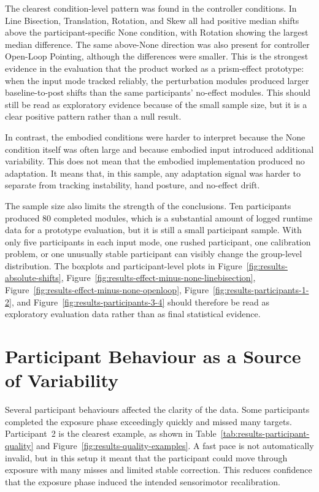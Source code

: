 The clearest condition-level pattern was found in the controller conditions. In Line Bisection, Translation, Rotation, and Skew all had positive median shifts above the participant-specific None condition, with Rotation showing the largest median difference. The same above-None direction was also present for controller Open-Loop Pointing, although the differences were smaller. This is the strongest evidence in the evaluation that the product worked as a prism-effect prototype: when the input mode tracked reliably, the perturbation modules produced larger baseline-to-post shifts than the same participants' no-effect modules. This should still be read as exploratory evidence because of the small sample size, but it is a clear positive pattern rather than a null result.

In contrast, the embodied conditions were harder to interpret because the None condition itself was often large and because embodied input introduced additional variability. This does not mean that the embodied implementation produced no adaptation. It means that, in this sample, any adaptation signal was harder to separate from tracking instability, hand posture, and no-effect drift.

The sample size also limits the strength of the conclusions. Ten participants produced 80 completed modules, which is a substantial amount of logged runtime data for a prototype evaluation, but it is still a small participant sample. With only five participants in each input mode, one rushed participant, one calibration problem, or one unusually stable participant can visibly change the group-level distribution. The boxplots and participant-level plots in Figure~\ref{fig:results-absolute-shifts}, Figure~\ref{fig:results-effect-minus-none-linebisection}, Figure~\ref{fig:results-effect-minus-none-openloop}, Figure~\ref{fig:results-participants-1-2}, and Figure~\ref{fig:results-participants-3-4} should therefore be read as exploratory evaluation data rather than as final statistical evidence.

\section{Participant Behaviour as a Source of Variability}
\label{sec:discussion-participant-behaviour}

Several participant behaviours affected the clarity of the data. Some participants completed the exposure phase exceedingly quickly and missed many targets. Participant~2 is the clearest example, as shown in Table~\ref{tab:results-participant-quality} and Figure~\ref{fig:results-quality-examples}. A fast pace is not automatically invalid, but in this setup it meant that the participant could move through exposure with many misses and limited stable correction. This reduces confidence that the exposure phase induced the intended sensorimotor recalibration.

